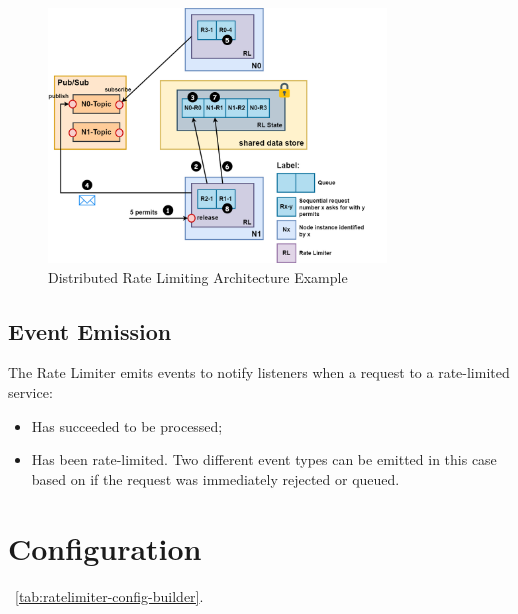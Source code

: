 \begin{figure}[!htb]
    \centering
    \includegraphics[width=0.8\textwidth]{../figures/06_distributed-rate-limiting-architecture}
    \caption{Distributed Rate Limiting Architecture Example}
    \label{fig:distributed-rate-limiting-architecture}
\end{figure}

\subsection{Event Emission}\label{subsec:rate-limiter-event-emission}

The Rate Limiter emits events to notify listeners when a request to a rate-limited service:

\begin{itemize}
    \item Has succeeded to be processed;
    \item Has been rate-limited.
    Two different event types can be emitted in this case based on if the request was immediately rejected or queued.
\end{itemize}


\section{Configuration}\label{sec:rate-limiter-configuration}

~\ref{tab:ratelimiter-config-builder}.

